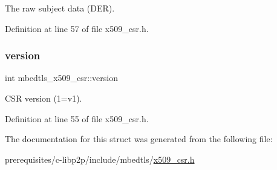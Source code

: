 The raw subject data (D\+ER). 

Definition at line 57 of file x509\+\_\+csr.\+h.

\mbox{\label{structmbedtls__x509__csr_a455e44fb96cdcd346788e0a41d7ab2b5}} 
\subsubsection{\texorpdfstring{version}{version}}
{\footnotesize\ttfamily int mbedtls\+\_\+x509\+\_\+csr\+::version}

C\+SR version (1=v1). 

Definition at line 55 of file x509\+\_\+csr.\+h.



The documentation for this struct was generated from the following file\+:\begin{DoxyCompactItemize}
\item 
prerequisites/c-\/libp2p/include/mbedtls/\mbox{\hyperlink{x509__csr_8h}{x509\+\_\+csr.\+h}}\end{DoxyCompactItemize}
